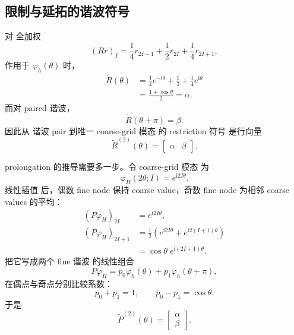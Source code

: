 \subsection{限制与延拓的谐波符号}

对 全加权
\begin{equation}
(Rr)_I
=\frac14r_{2I-1}+\frac12r_{2I}+\frac14r_{2I+1},
\end{equation}
作用于 $\varphi_h(\theta)$ 时，
\begin{align}
\widetilde R(\theta)
&=\frac14e^{-\mathrm i\theta}+\frac12+\frac14e^{\mathrm i\theta}\\
&=\frac{1+\cos\theta}{2}
=\alpha.
\end{align}
而对 paired 谐波，
\begin{equation}
\widetilde R(\theta+\pi)=\beta.
\end{equation}
因此从 谐波 pair 到唯一 coarse-grid 模态 的 restriction 符号 是行向量
\begin{equation}
\boxed{
\widetilde R^{(2)}(\theta)
=\begin{bmatrix}\alpha&\beta\end{bmatrix}.}
\label{eq:lfa-pair-restriction}
\end{equation}

prolongation 的推导需要多一步。令 coarse-grid 模态 为
\begin{equation}
\varphi_H(2\theta;I)=e^{\mathrm i2I\theta}.
\end{equation}
线性插值 后，偶数 fine node 保持 coarse value，奇数 fine node 为相邻 coarse values 的平均：
\begin{align}
(P\varphi_H)_{2I}
&=e^{\mathrm i2I\theta},\\
(P\varphi_H)_{2I+1}
&=\frac12\left(e^{\mathrm i2I\theta}+e^{\mathrm i2(I+1)\theta}\right)\\
&=\cos\theta\;e^{\mathrm i(2I+1)\theta}.
\end{align}
把它写成两个 fine 谐波 的线性组合
\begin{equation}
P\varphi_H
=p_0\varphi_h(\theta)+p_1\varphi_h(\theta+\pi),
\end{equation}
在偶点与奇点分别比较系数：
\begin{equation}
p_0+p_1=1,
\qquad
p_0-p_1=\cos\theta.
\end{equation}
于是
\begin{equation}
\boxed{
\widetilde P^{(2)}(\theta)
=\begin{bmatrix}\alpha\\\beta\end{bmatrix}.}
\label{eq:lfa-pair-prolongation}
\end{equation}

